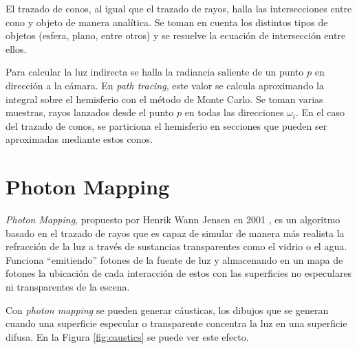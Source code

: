 El trazado de conos, al igual que el trazado de rayos, halla las intersecciones entre cono y objeto de manera analítica.
Se toman en cuenta los distintos tipos de objetos (esfera, plano, entre otros) y se resuelve la ecuación de intersección entre ellos.


Para calcular la luz indirecta se halla la radiancia saliente de un punto $p$ en dirección a la cámara.
En \textit{path tracing}, este valor se calcula aproximando la integral sobre el hemisferio con el método de Monte Carlo.
Se toman varias muestras, rayos lanzados desde el punto $p$ en todas las direcciones $\omega_i$.
En el caso del trazado de conos, se particiona el hemisferio en secciones que pueden ser aproximadas mediante estos conos.

\section{Photon Mapping}\label{sec:photon-mapping}

\textit{Photon Mapping}, propuesto por Henrik Wann Jensen en 2001 \cite{photon-mapping}, es un algoritmo basado en el trazado de rayos que es capaz de simular de manera más realista la refracción de la luz a través de sustancias transparentes como el vidrio o el agua. 
Funciona ``emitiendo'' fotones de la fuente de luz y almacenando en un mapa de fotones la ubicación de cada interacción de estos con las superficies no especulares ni transparentes de la escena.

Con \textit{photon mapping} se pueden generar cáusticas, los dibujos que se generan cuando una superficie especular o transparente concentra la luz en una superficie difusa.
En la Figura \ref{fig:caustics} se puede ver este efecto.

